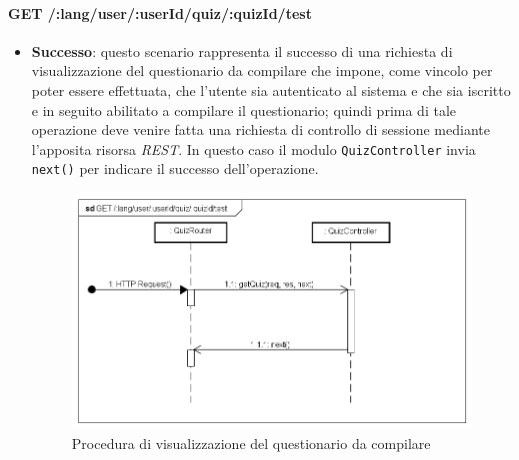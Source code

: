\paragraph{GET /:lang/user/:userId/quiz/:quizId/test} %
\begin{itemize}
\item \textbf{Successo}: questo scenario rappresenta il successo di una richiesta di visualizzazione del questionario da compilare che impone, come vincolo per poter essere effettuata, che l'utente sia autenticato al sistema e che sia iscritto e in seguito abilitato a compilare il questionario; quindi prima di tale operazione deve venire fatta una richiesta di controllo di sessione mediante l'apposita risorsa \textit{REST}. In questo caso il modulo \texttt{QuizController} invia \texttt{next()} per indicare il successo dell'operazione.
\label{Procedura di visualizzazione del questionario da compilare}
\begin{figure}[ht]
	\centering
	\includegraphics[scale=0.50]{UML/DiagrammiDiSequenza/Back-end/GET__lang_user_userId_quiz_quizId_test_success.png}
	\caption{Procedura di visualizzazione del questionario da compilare}
\end{figure}
\FloatBarrier


\end{itemize}
